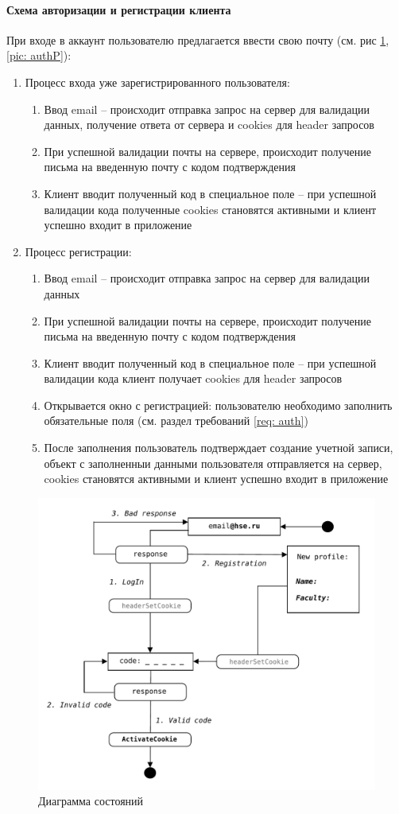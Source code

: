 \documentclass[a4paper,12pt]{article}
\begin{document}
	\paragraph{Схема авторизации и регистрации клиента\\}
	При входе в аккаунт пользователю предлагается ввести свою почту (см. рис \ref{pic: auth}, \ref{pic: authP}):
	\begin{enumerate}
		\item Процесс входа уже зарегистрированного пользователя:
		\begin{enumerate}
			\item Ввод email -- происходит отправка запрос на сервер для валидации данных, получение ответа от сервера и cookies для header запросов
			\item При успешной валидации почты на сервере, происходит получение письма на введенную почту с кодом подтверждения 
			\item Клиент вводит полученный код в специальное поле -- при успешной валидации кода полученные cookies становятся активными и клиент успешно входит в приложение
		\end{enumerate}
	\item Процесс регистрации:
		\begin{enumerate}
			\item Ввод email -- происходит отправка запрос на сервер для валидации данных
			\item При успешной валидации почты на сервере, происходит получение письма на введенную почту с кодом подтверждения 
			\item Клиент вводит полученный код в специальное поле -- при успешной валидации кода клиент получает cookies для header запросов
			\item Открывается окно с регистрацией: пользователю необходимо заполнить обязательные поля (см. раздел требований \ref{req: auth})
			\item После заполнения пользователь подтверждает создание учетной записи, объект с заполненныи данными пользователя отправляется на сервер, cookies становятся активными и клиент успешно входит в приложение
		\end{enumerate}
	\end{enumerate}
	\begin{figure}[h!]
		\centering
		\includegraphics[width = 0.7\linewidth]{../includes/illustrations/Auth.pdf}
		\caption{Диаграмма состояний}
		\label{pic: auth}
	\end{figure}
\end{document}
